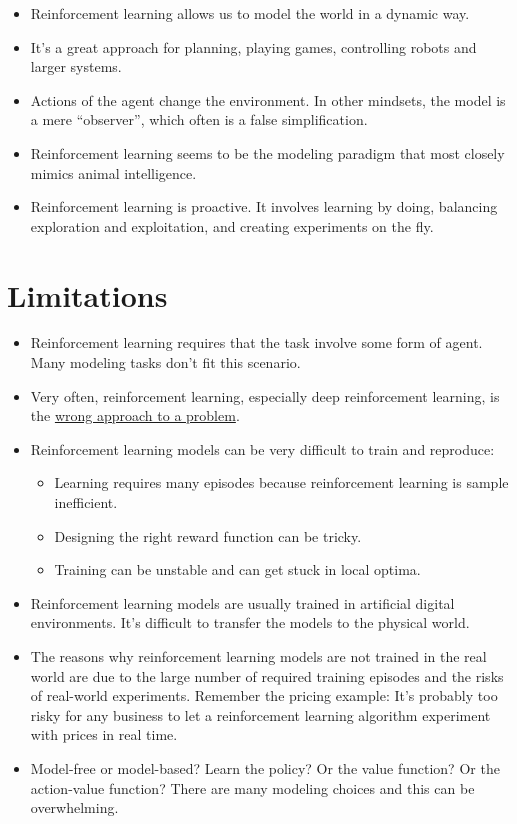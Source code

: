 \documentclass[
  10pt,
]{scrbook}
\providecommand{\tightlist}{%
  \setlength{\itemsep}{0pt}\setlength{\parskip}{0pt}}
\begin{document}
\begin{itemize}
\tightlist
\item
  Reinforcement learning allows us to model the world in a dynamic way.
\item
  It's a great approach for planning, playing games, controlling robots and larger systems.
\item
  Actions of the agent change the environment. In other mindsets, the model is a mere ``observer'', which often is a false simplification.
\item
  Reinforcement learning seems to be the modeling paradigm that most closely mimics animal intelligence.
\item
  Reinforcement learning is proactive. It involves learning by doing, balancing exploration and exploitation, and creating experiments on the fly.
\end{itemize}

\hypertarget{limitations-8}{%
\section{Limitations}\label{limitations-8}}

\begin{itemize}
\tightlist
\item
  Reinforcement learning requires that the task involve some form of agent. Many modeling tasks don't fit this scenario.
\item
  Very often, reinforcement learning, especially deep reinforcement learning, is the \href{https://www.alexirpan.com/2018/02/14/rl-hard.html}{wrong approach to a problem}.
\item
  Reinforcement learning models can be very difficult to train and reproduce:

  \begin{itemize}
  \tightlist
  \item
    Learning requires many episodes because reinforcement learning is sample inefficient.
  \item
    Designing the right reward function can be tricky.
  \item
    Training can be unstable and can get stuck in local optima.
  \end{itemize}
\item
  Reinforcement learning models are usually trained in artificial digital environments. It's difficult to transfer the models to the physical world.
\item
  The reasons why reinforcement learning models are not trained in the real world are due to the large number of required training episodes and the risks of real-world experiments. Remember the pricing example: It's probably too risky for any business to let a reinforcement learning algorithm experiment with prices in real time.
\item
  Model-free or model-based? Learn the policy? Or the value function? Or the action-value function? There are many modeling choices and this can be overwhelming.
\end{itemize}
\end{document}
